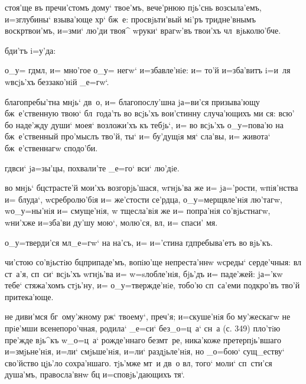  стоя'ще въ пречи'стомъ дому` твое'мъ, 
вече'рнюю пjь'снь возсыла'емъ, и=з\ъ глубины` взыва'юще 
хр` бж~е: просвjьти'вый мi'ръ тридне'внымъ 
воскр твои'мъ, и=зми` лю'ди твоя^ w\т руки` 
врагw'въ твои'хъ чл~вjьколю'бче.


  бди'тъ i=у'да:

  о_у= гд мл, и= мно'гое о_у= 
негw` и=збавле'нiе: и= то'й и=зба'витъ i=и~ля w\т всjь'хъ 
беззако'нiй _е=гw`.

 благопребы'тна мнjь` дв~о, и= 
благопослу'шна jа=ви'ся призыва'ющу бж~е'ственную твою` 
бл~года'ть во всjь'хъ вои'стинну случа'ющихъ ми ся: всю' 
бо наде'жду души` моея` возложи'хъ къ тебjь`, и= во 
всjь'хъ о_у=пова'ю на бж~е'ственный про'мыслъ тво'й, ты` 
и= бу'дущiя мя` сла'вы, и= живота` бж~е'ственнагw 
сподо'би.

  гд вси` jа=зы'цы, похвали'те 
_е=го` вси` лю'дiе.

 во мнjь` бц страсте'й мои'хъ 
возгорjь'шася, w\т гнjь'ва же и= jа='рости, w\т пiя'нства 
и= блуда`, w\т сребролю'бiя и= же'стости се'рдца, 
о_у=мерщвле'нiя лю'тагw, w\т о_у=ны'нiя и= смуще'нiя, w\т 
тщесла'вiя же и= попра'нiя со'вjьстнагw, w\т ни'хже 
и=зба'ви ду'шу мою`, молю'ся, вл, и= спаси' мя.

  о_у=тверди'ся мл _е=гw` на 
на'съ, и= и='стина гд пребыва'етъ во вjь'къ.

 чи'стою со'вjьстiю бц припаде'мъ, 
вопiю'ще непреста'ннw w\т среды` серде'чныя: вл 
ст~а'я, сп~си` всjь'хъ w\т гнjь'ва и= w=sлобле'нiя, 
бjь'дъ и= паде'жей: jа='кw тебе` стяжа'хомъ стjь'ну, и= 
о_у=твержде'нiе, тобо'ю сп~са'еми под\ъ кро'въ тво'й 
притека'юще.

     не 
диви'мся бг~ому'жному рж` твоему`, преч'я; 
и=скуше'нiя бо му'жескагw не прiе'мши всенепоро'чная, 
родила` _е=си` без\ъ _о=ц~а` сн~а (с. 349) пло'тiю 
пре'жде вjь^къ w\т _о=ц~а` рожде'ннаго без\ъ мт~ре, 
ника'коже претерпjь'вшаго и=змjьне'нiя, и=ли` смjьше'нiя, 
и=ли` раздjьле'нiя, но _о=бою` сущ_еству` сво'йство 
цjь'ло сохра'ншаго. тjь'мже мт~и дв~о вл, того` 
моли` сп~сти'ся душа'мъ, правосла'внw бц 
и=сповjь'дающихъ тя`.

